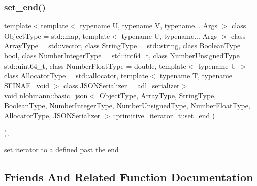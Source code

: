 \subsubsection{\texorpdfstring{set\+\_\+end()}{set\_end()}}
{\footnotesize\ttfamily template$<$template$<$ typename U, typename V, typename... Args $>$ class Object\+Type = std\+::map, template$<$ typename U, typename... Args $>$ class Array\+Type = std\+::vector, class String\+Type  = std\+::string, class Boolean\+Type  = bool, class Number\+Integer\+Type  = std\+::int64\+\_\+t, class Number\+Unsigned\+Type  = std\+::uint64\+\_\+t, class Number\+Float\+Type  = double, template$<$ typename U $>$ class Allocator\+Type = std\+::allocator, template$<$ typename T, typename S\+F\+I\+N\+A\+E=void $>$ class J\+S\+O\+N\+Serializer = adl\+\_\+serializer$>$ \\
void \hyperlink{classnlohmann_1_1basic__json}{nlohmann\+::basic\+\_\+json}$<$ Object\+Type, Array\+Type, String\+Type, Boolean\+Type, Number\+Integer\+Type, Number\+Unsigned\+Type, Number\+Float\+Type, Allocator\+Type, J\+S\+O\+N\+Serializer $>$\+::primitive\+\_\+iterator\+\_\+t\+::set\+\_\+end (\begin{DoxyParamCaption}{ }\end{DoxyParamCaption})\hspace{0.3cm}{\ttfamily [inline]}, {\ttfamily [noexcept]}}



set iterator to a defined past the end 



\subsection{Friends And Related Function Documentation}
\mbox{\label{classnlohmann_1_1basic__json_1_1primitive__iterator__t_a1897889271e3fff10792d86baf1dbfdc}} 

